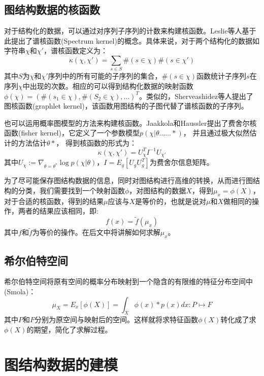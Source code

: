 \subsection{图结构数据的核函数}
对于结构化的数据，可以通过对序列子序列的计数来构建核函数。Leslie\cite{leslie2001spectrum}等人基于此提出了谱核函数(Spectrum kernel)的概念。具体来说，对于两个结构化的数据如字符串$\chi$和$\chi'$，谱核函数定义为：
\begin{equation*}
\kappa(\chi, \chi') = \sum_{s\in S}\#(s\in \chi)\#(s \in \chi')
\end{equation*}
其中$S$为$\chi$和$\chi'$序列中的所有可能的子序列的集合，$\#(s\in \chi)$函数统计子序列$s$在序列$\chi$中出现的次数。相应的可以得到结构化数据的映射函数$\phi(\chi)=(\#(s_1\in \chi), \#(S_2\in \chi), ...)^T$。类似的，Sherveashidez\cite{shervashidze2009efficient}等人提出了图核函数(graphlet kernel)，该函数用图结构的子图代替了谱核函数的子序列。
\par 也可以运用概率图模型的方法来构建核函数。Jaakkola和Haussler\cite{jaakkola1999using}提出了费舍尔核函数(fisher kernel)，它定义了一个参数模型$p(\chi|\theta……*)$， 并且通过极大似然估计的方法估计$\theta*$， 得到核函数的形式为：
\begin{equation*}
\kappa(\chi, \chi') = U_\chi^TI^{-1}U_{\chi'}
\end{equation*}
其中$U_\chi := \nabla_{\theta=\theta^*}\log p(\chi|\theta)$，$I=E_g[U_gU_g^T]$为费舍尔信息矩阵。
\par 为了尽可能保存图结构数据的信息，同时对图结构进行高维的转换，从而进行图结构的分类，我们需要找到一个映射函数$\phi$，对图结构的数据$X$，得到$\mu_x = \phi(X)$，对于合适的核函数，得到的结果$\mu$应该与$X$是等价的，也就是说对$\mu$和$X$做相同的操作，两者的结果应该相同，即:
$$f(x)=\tilde{f}(\mu_x)$$
其中$f$和$\tilde{f}$为等价的操作。在后文中将讲解如何求解$\mu_x$。
\subsection{希尔伯特空间}
希尔伯特空间将原有空间的概率分布映射到一个隐含的有限维的特征分布空间中(Smola\cite{smola2007hilbert})：
$$\mu_X = E_x [\phi(X)] = \int_X \phi(x)*p(x)dx : P\mapsto F$$
其中$P$和$F$分别为原空间与映射后的空间。这样就将求特征函数$\phi(X)$转化成了求$\phi(X)$的期望，简化了求解过程。
\section{图结构数据的建模}
